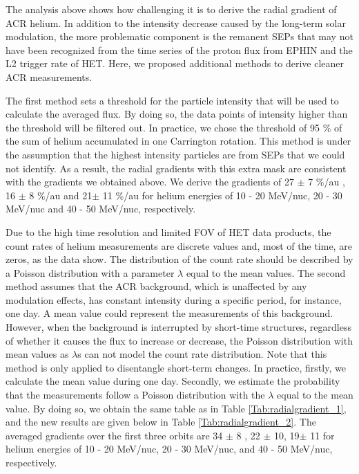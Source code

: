 The analysis above shows how challenging it is to derive the radial gradient of \ac{ACR} helium. In addition to the intensity decrease caused by the long-term solar modulation, the more problematic component is the remanent \acp{SEP} that may not have been recognized from the time series of the proton flux from \ac{EPHIN} and the L2 trigger rate of \ac{HET}. Here, we proposed additional methods to derive cleaner \ac{ACR} measurements.

The first method sets a threshold for the particle intensity that will be used to calculate the averaged flux. By doing so, the data points of intensity higher than the threshold will be filtered out. In practice, we chose the threshold of 95 \% of the sum of helium accumulated in one Carrington rotation. This method is under the assumption that the highest intensity particles are from \acp{SEP} that we could not identify. As a result, the radial gradients with this extra mask are consistent with the gradients we obtained above. We derive the gradients of 27 $\pm$ 7 \%/au , 16 $\pm$ 8 \%/au and 21$\pm$ 11 \%/au for helium energies of 10 - 20 MeV/nuc, 20 - 30 MeV/nuc and 40 - 50 MeV/nuc, respectively. 


Due to the high time resolution and limited \ac{FOV} of \ac{HET} data products, the count rates of helium measurements are discrete values and, most of the time, are zeros, as the data show. The distribution of the count rate should be described by a Poisson distribution with a parameter $\lambda$ equal to the mean values. 
The second method assumes that the \ac{ACR} background, which is unaffected by any modulation effects, has constant intensity during a specific period, for instance, one day. A mean value could represent the measurements of this background. However, when the background is interrupted by short-time structures, regardless of whether it causes the flux to increase or decrease, the Poisson distribution with mean values as $\lambda$s can not model the count rate distribution. Note that this method is only applied to disentangle short-term changes. 
In practice, firstly, we calculate the mean value during one day. Secondly, we estimate the probability that the measurements follow a Poisson distribution with the $\lambda$ equal to the mean value.
By doing so, we obtain the same table as in Table \ref{Tab:radialgradient_1}, and the new results are given below in Table \ref{Tab:radialgradient_2}.
The averaged gradients over the first three orbits are 34 $\pm$ 8 , 22 $\pm$ 10, 19$\pm$ 11 for helium energies of 10 - 20 MeV/nuc, 20 - 30 MeV/nuc, and 40 - 50 MeV/nuc, respectively. 


